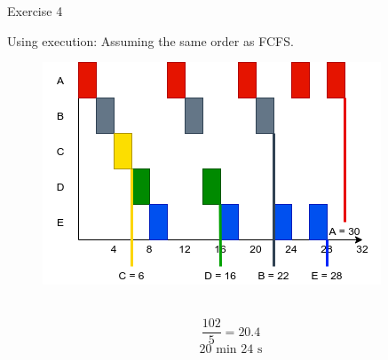 \documentclass[10pt]{beamer}
\begin{document}
\begin{frame}{Exercise 4}
\begin{enumerate}
		Using execution: Assuming the same order as FCFS.  \\ \vspace{0.7cm}
		\begin{minipage}{0.5\textwidth}
            \begin{figure}
                \includegraphics[keepaspectratio, width=\textwidth, height=\textheight]{img/rr.png} \\
            \end{figure}
		\end{minipage} \hfill \begin{minipage}{0.3\textwidth}
        \end{minipage} \\ \vspace{0.7cm}
        \alert{\[\frac{102}{5} = 20.4 \] 
                \[ 20\text{ min } 24\text{ s} \]}
        

\end{enumerate}
\end{frame}
\end{document}
